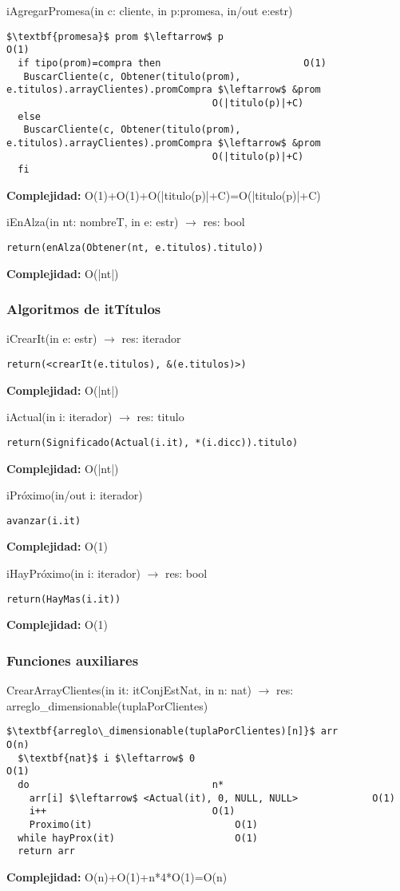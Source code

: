 iAgregarPromesa(in c: cliente, in p:promesa, in/out e:estr)
\begin{lstlisting}[mathescape]
  $\textbf{promesa}$ prom $\leftarrow$ p									O(1)
  if tipo(prom)=compra then							O(1)
   BuscarCliente(c, Obtener(titulo(prom), e.titulos).arrayClientes).promCompra $\leftarrow$ &prom
   									O(|titulo(p)|+C)
  else
   BuscarCliente(c, Obtener(titulo(prom), e.titulos).arrayClientes).promCompra $\leftarrow$ &prom
   									O(|titulo(p)|+C)
  fi
\end{lstlisting}
\textbf{Complejidad:} O(1)+O(1)+O(|titulo(p)|+C)=O(|titulo(p)|+C)

iEnAlza(in nt: nombreT, in e: estr) $\rightarrow$ res: bool
\begin{lstlisting}[mathescape]
  return(enAlza(Obtener(nt, e.titulos).titulo))
\end{lstlisting}
\textbf{Complejidad:} O(|nt|)



\subsubsection{Algoritmos de itT\'itulos}

iCrearIt(in e: estr) $\rightarrow$ res: iterador
\begin{lstlisting}[mathescape]
  return(<crearIt(e.titulos), &(e.titulos)>)
\end{lstlisting}
\textbf{Complejidad:} O(|nt|)

iActual(in i: iterador) $\rightarrow$ res: titulo
\begin{lstlisting}[mathescape]
  return(Significado(Actual(i.it), *(i.dicc)).titulo)
\end{lstlisting}
\textbf{Complejidad:} O(|nt|)

iPr\'oximo(in/out i: iterador)
\begin{lstlisting}[mathescape]
  avanzar(i.it)
\end{lstlisting}
\textbf{Complejidad:} O(1)

iHayPr\'oximo(in i: iterador) $\rightarrow$ res: bool
\begin{lstlisting}[mathescape]
  return(HayMas(i.it))
\end{lstlisting}
\textbf{Complejidad:} O(1)



\subsubsection{Funciones auxiliares}
CrearArrayClientes(in it: itConjEstNat, in n: nat) $\rightarrow$ res: arreglo\_dimensionable(tuplaPorClientes)
\begin{lstlisting}[mathescape]
  $\textbf{arreglo\_dimensionable(tuplaPorClientes)[n]}$ arr					O(n)
  $\textbf{nat}$ i $\leftarrow$ 0									O(1)
  do								n*
    arr[i] $\leftarrow$ <Actual(it), 0, NULL, NULL>				O(1)
    i++								O(1)
    Proximo(it)							O(1)
  while hayProx(it)						O(1)
  return arr
\end{lstlisting}
\textbf{Complejidad:} O(n)+O(1)+n*4*O(1)=O(n)

